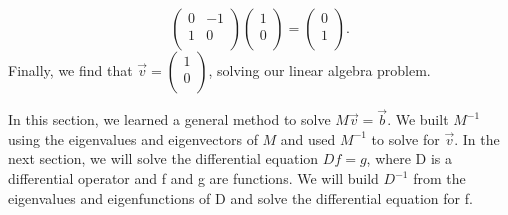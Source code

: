 \documentclass[12pt]{article}
\begin{document}
\begin{equation}
\begin{pmatrix}
0 & -1 \\
1 & 0 \\
\end{pmatrix}
\begin{pmatrix}
1 \\
0 \\
\end{pmatrix}
=
\begin{pmatrix}
0 \\
1 \\
\end{pmatrix}.
\end{equation}
Finally, we find that $\vec{v} = \begin{pmatrix} 1 \\ 0 \\ \end{pmatrix}$, solving our linear algebra problem.

In this section, we learned a general method to solve $M\vec{v}=\vec{b}$. We built $M^{-1}$ using the eigenvalues and eigenvectors of $M$ and used $M^{-1}$ to solve for $\vec{v}$. In the next section, we will solve the differential equation $Df=g$, where D is a differential operator and f and g are functions. We will build $D^{-1}$ from the eigenvalues and eigenfunctions of D and solve the differential equation for f. 
\end{document}
